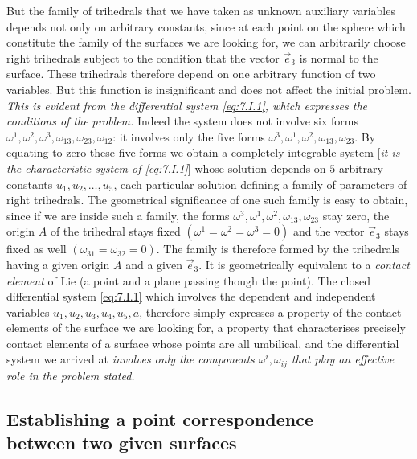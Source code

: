 \documentclass[leqno,11pt]{book}
\numberwithin{equation}{chapter}
\theoremstyle{shape1}
\theoremstyle{shape0}
\theoremstyle{shape2}
\theoremstyle{definition}
\begin{document}
But the family of trihedrals that we have taken as unknown auxiliary variables depends not only on arbitrary constants, since at each point on the sphere which constitute the family of the surfaces we are looking for, we can arbitrarily choose right trihedrals subject to the condition that the vector $\vec e_{3}$ is normal to the surface. These trihedrals therefore depend on one arbitrary function of two variables. But this function is insignificant and does not affect the initial problem. \emph{This is evident from the differential system \eqref{eq:7.I.1}, which expresses the conditions of the problem.} Indeed the system does not involve six forms $\omega^{1},\omega^{2},\omega^{3},\omega_{13},\omega_{23},\omega_{12}$: it involves only the five forms $\omega^{3},\omega^{1},\omega^{2},\omega_{13},\omega_{23}$. By equating to zero these five forms we obtain a completely integrable system [\emph{it is the characteristic system of \eqref{eq:7.I.1}}] whose solution depends on $5$ arbitrary constants $u_{1},u_{2},\dots, u_{5}$, each particular solution defining a family of parameters of right trihedrals. The geometrical significance of one such family is easy to obtain, since if we are inside such a family, the forms $\omega^{3},\omega^{1},\omega^{2},\omega_{13},\omega_{23}$ stay zero, the origin $A$ of the trihedral stays fixed $(\omega^{1}=\omega^{2}=\omega^{3}=0)$ and the vector $\vec e_{3}$ stays fixed as well $(\omega_{31}=\omega_{32}=0)$. The family is therefore formed by the trihedrals having a given origin $A$ and a given $\vec e_{3}$. It is geometrically equivalent to a \emph{contact element} of Lie (a point and a plane passing though the point). The closed differential system \eqref{eq:7.I.1} which involves the dependent and independent variables $u_{1},u_{2},u_{3},u_{4},u_{5},a$, therefore simply expresses a property of the contact elements of the surface we are looking for, a property that characterises precisely contact elements of a surface whose points are all umbilical, and the differential system we arrived at \emph{involves only the components $\omega^{i},\omega_{ij}$ that play an effective role in the problem stated.}



\subsection[{Establishing a point correspondence between two given surfaces}]{Establishing a point correspondence\\between two given surfaces}
\label{sec:establ-point-corr}
\end{document}
